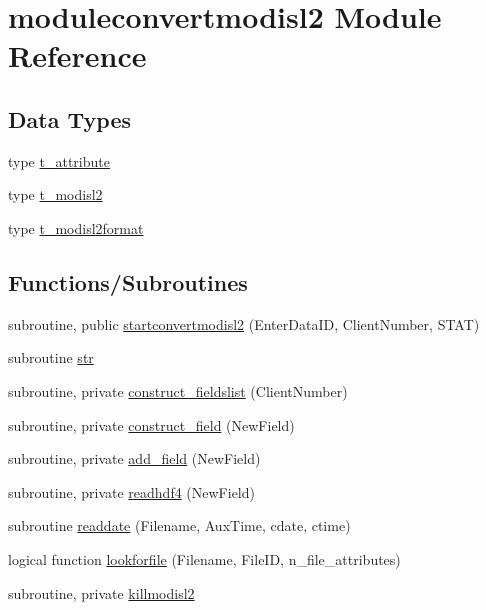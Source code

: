 \hypertarget{namespacemoduleconvertmodisl2}{}\section{moduleconvertmodisl2 Module Reference}
\label{namespacemoduleconvertmodisl2}
\subsection*{Data Types}
\begin{DoxyCompactItemize}
\item 
type \mbox{\hyperlink{structmoduleconvertmodisl2_1_1t__attribute}{t\+\_\+attribute}}
\item 
type \mbox{\hyperlink{structmoduleconvertmodisl2_1_1t__modisl2}{t\+\_\+modisl2}}
\item 
type \mbox{\hyperlink{structmoduleconvertmodisl2_1_1t__modisl2format}{t\+\_\+modisl2format}}
\end{DoxyCompactItemize}
\subsection*{Functions/\+Subroutines}
\begin{DoxyCompactItemize}
\item 
subroutine, public \mbox{\hyperlink{namespacemoduleconvertmodisl2_aa38d6c70d36fe4b61950bdeaf7f6ff18}{startconvertmodisl2}} (Enter\+Data\+ID, Client\+Number, S\+T\+AT)
\item 
subroutine \mbox{\hyperlink{namespacemoduleconvertmodisl2_a1526471e2bde49d7ab2752ae78288ef5}{str}}
\item 
subroutine, private \mbox{\hyperlink{namespacemoduleconvertmodisl2_ab79be5b024d52c708202d2716a6467e7}{construct\+\_\+fieldslist}} (Client\+Number)
\item 
subroutine, private \mbox{\hyperlink{namespacemoduleconvertmodisl2_a8eaadcf3a3d4a83e399eabd3c0502909}{construct\+\_\+field}} (New\+Field)
\item 
subroutine, private \mbox{\hyperlink{namespacemoduleconvertmodisl2_a133fa594d1513ec9b6ed011f318d87e8}{add\+\_\+field}} (New\+Field)
\item 
subroutine, private \mbox{\hyperlink{namespacemoduleconvertmodisl2_a816da8e71fe8787069f3e7359fc8445f}{readhdf4}} (New\+Field)
\item 
subroutine \mbox{\hyperlink{namespacemoduleconvertmodisl2_a0d7d930d189037284103c8340c2d3cf6}{readdate}} (Filename, Aux\+Time, cdate, ctime)
\item 
logical function \mbox{\hyperlink{namespacemoduleconvertmodisl2_a95ba390f4da93899410109801bcd5011}{lookforfile}} (Filename, File\+ID, n\+\_\+file\+\_\+attributes)
\item 
subroutine, private \mbox{\hyperlink{namespacemoduleconvertmodisl2_ac166b6c8f2cb482fc76e22739ee0a87d}{killmodisl2}}
\end{DoxyCompactItemize}
